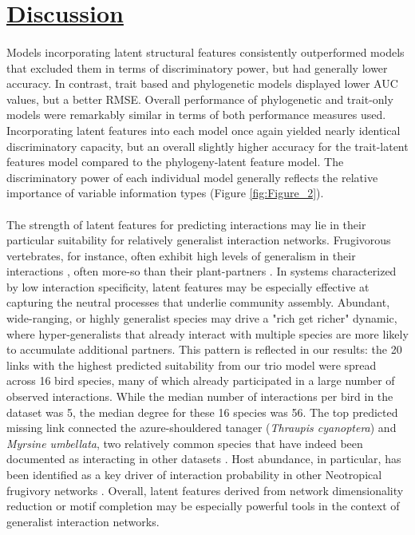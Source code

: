 \section*{\textbf{\underline{Discussion}}}
\paragraph*{}
Models incorporating latent structural features consistently outperformed models that excluded them in terms of discriminatory power, but had generally lower accuracy. In contrast, trait based and phylogenetic models displayed lower AUC values, but a better RMSE. Overall performance of phylogenetic and trait-only models were remarkably similar in terms of both performance measures used. Incorporating latent features into each model once again yielded nearly identical discriminatory  capacity, but an overall slightly higher accuracy for the trait-latent features model compared to the phylogeny-latent feature model. The discriminatory power of each individual model generally reflects the relative importance of variable information types (Figure \ref{fig:Figure_2}). 

\paragraph*{}
The strength of latent features for predicting interactions may lie in their particular suitability for relatively generalist interaction networks. Frugivorous vertebrates, for instance, often exhibit high levels of generalism in their interactions \parencite{richardson2000plant}, often more-so than their plant-partners \parencite{salazar2020frugivory}. In systems characterized by low interaction specificity, latent features may be especially effective at capturing the neutral processes that underlie community assembly. Abundant, wide-ranging, or highly generalist species may drive a "rich get richer" dynamic, where hyper-generalists that already interact with multiple species are more likely to accumulate additional partners. This pattern is reflected in our results: the 20 links with the highest predicted suitability from our trio model were spread across 16 bird species, many of which already participated in a large number of observed interactions. While the median number of interactions per bird in the dataset was 5, the median degree for these 16 species was 56. The top predicted missing link connected the azure-shouldered tanager (\emph{Thraupis cyanoptera}) and \emph{Myrsine umbellata}, two relatively common species that have indeed been documented as interacting in other datasets \parencite{silva2002patterns, fricke2020accelerating}. Host abundance, in particular, has been identified as a key driver of interaction probability in other Neotropical frugivory networks \parencite{laurindo2020drivers}. Overall, latent features derived from network dimensionality reduction or motif completion may be especially powerful tools in the context of generalist interaction networks. 

